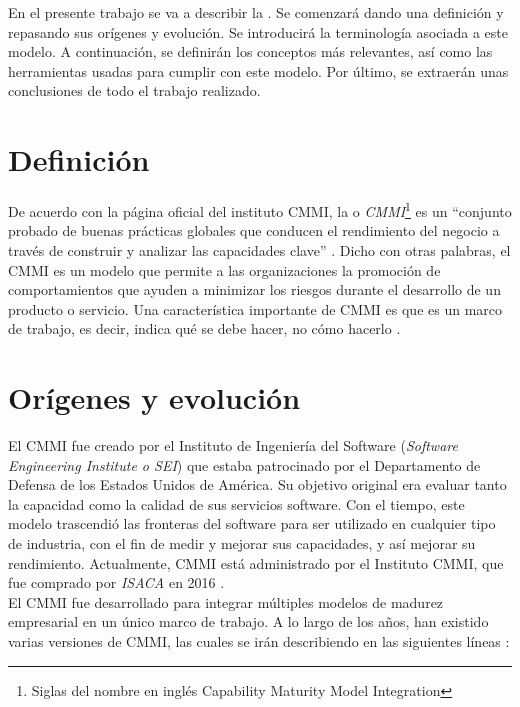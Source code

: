 En el presente trabajo se va a describir la \trabajo. Se comenzará dando una definición y repasando sus orígenes y evolución. Se introducirá la terminología asociada a este modelo. A continuación, se definirán los conceptos más relevantes, así como las herramientas usadas para cumplir con este modelo. Por último, se extraerán unas conclusiones de todo el trabajo realizado.

\section{Definición}

De acuerdo con la página oficial del instituto CMMI, la \trabajo o \textit{CMMI}\footnote{Siglas del nombre en inglés Capability Maturity Model Integration} es un ``conjunto probado de buenas prácticas globales que conducen el rendimiento del negocio a través de construir y analizar las capacidades clave'' \cite{definition}. Dicho con otras palabras, el CMMI es un modelo que permite a las organizaciones la promoción de comportamientos que ayuden a minimizar los riesgos durante el desarrollo de un producto o servicio. Una característica importante de CMMI es que es un marco de trabajo, es decir, indica qué se debe hacer, no cómo hacerlo \cite{definition2}\cite{definicion3}.

\section{Orígenes y evolución}

El CMMI fue creado por el Instituto de Ingeniería del Software (\textit{Software Engineering Institute o SEI}) que estaba patrocinado por el Departamento de Defensa de los Estados Unidos de América. Su objetivo original era evaluar tanto la capacidad como la calidad de sus servicios software. Con el tiempo, este modelo trascendió las fronteras del software para ser utilizado en cualquier tipo de industria, con el fin de medir y mejorar sus capacidades, y así mejorar su rendimiento. Actualmente, CMMI está administrado por el Instituto CMMI, que fue comprado por \textit{ISACA} en 2016 \cite{definition}\cite{definition2}.\\

El CMMI fue desarrollado para integrar múltiples modelos de madurez empresarial en un único marco de trabajo. A lo largo de los años, han existido varias versiones de CMMI, las cuales se irán describiendo en las siguientes líneas \cite{history}: 

